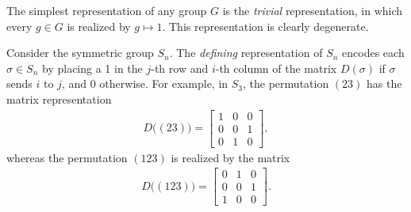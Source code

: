 \begin{example}
    The simplest representation of any group $G$ is the \textit{trivial} representation, in which every $g\in G$ is realized by $g\mapsto 1$. This representation is clearly degenerate.
\end{example}

\begin{example}
    Consider the symmetric group $S_n$. The \textit{defining} representation of $S_n$ encodes each $\sigma\in S_n$ by placing a 1 in the $j$-th row and $i$-th column of the matrix $D(\sigma)$ if $\sigma$ sends $i$ to $j$, and 0 otherwise. For example, in $S_3$, the permutation $(23)$ has the matrix representation
    \begin{align*}
        D\big((23)\big) = \begin{bmatrix} 1 & 0 & 0 \\ 0 & 0 & 1 \\ 0 & 1 & 0 \end{bmatrix},
    \end{align*}
    whereas the permutation $(123)$ is realized by the matrix
    \begin{align*}
        D\big((123)\big) = \begin{bmatrix} 0 & 1 & 0 \\ 0 & 0 & 1 \\ 1 & 0 & 0 \end{bmatrix}.
    \end{align*}
\end{example}

